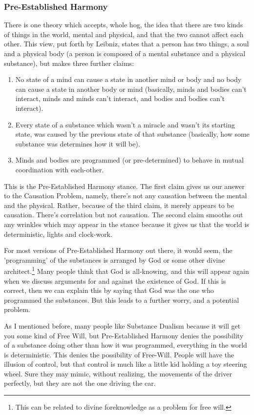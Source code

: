 \subsubsection{Pre-Established Harmony}
There is one theory which accepts, whole hog, the idea that there are two kinds of things in the world, mental and physical, and that the two cannot affect each other. This view, put forth by Leibniz,\autocite[p. 33]{Leibniz2} states that a person has two things, a soul and a physical body (a person is composed of a mental substance and a physical substance), but makes three further claims:
\begin{enumerate}
    \item[]No state of a mind can cause a state in another mind or body and no body can cause a state in another body or mind (basically, minds and bodies can't interact, minds and minds can't interact, and bodies and bodies can't interact).
    \item[]Every state of a substance which wasn't a miracle and wasn't its starting state, was caused by the previous state of that substance (basically, how some substance was determines how it will be).
    \item[]Minds and bodies are programmed (or pre-determined) to behave in mutual coordination with each-other. 
\end{enumerate}
This is the Pre-Established Harmony stance. The first claim gives us our answer to the Causation Problem, namely, there's not any causation between the mental and the physical. Rather, because of the third claim, it merely appears to be causation. There's correlation but not causation. The second claim smooths out any wrinkles which may appear in the stance because it gives us that the world is deterministic, lights and clock-work. 

For most versions of Pre-Established Harmony out there, it would seem, the 'programming' of the substances is arranged by God or some other divine architect.\footnote{This can be related to divine foreknowledge as a problem for free will.} Many people think that God is all-knowing, and this will appear again when we discuss arguments for and against the existence of God. If this is correct, then we can explain this by saying that God was the one who programmed the substances. But this leads to a further worry, and a potential problem. 

As I mentioned before, many people like Substance Dualism because it will get you some kind of Free Will, but Pre-Established Harmony denies the possibility of a substance doing other than how it was programmed, everything in the world is deterministic. This denies the possibility of Free-Will. People will have the illusion of control, but that control is much like a little kid holding a toy steering wheel. Sure they may mimic, without realizing, the movements of the driver perfectly, but they are not the one driving the car. 

